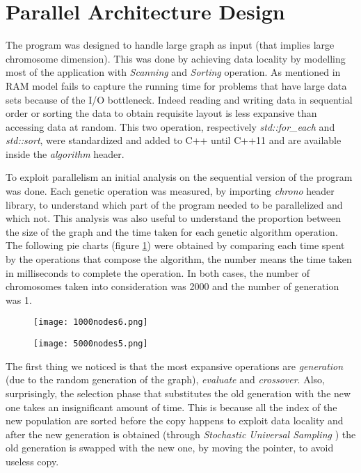 \section{Parallel Architecture Design}
The program was designed to handle large graph as input (that implies large chromosome dimension). This was done by achieving data locality by modelling most of the application with \textit{Scanning} and \textit{Sorting} operation. As mentioned in \cite{algo-eng} RAM model fails to capture the running time for problems that have large data sets because of the I/O bottleneck. Indeed reading and writing data in sequential order or sorting the data to obtain requisite layout is less expansive than accessing data at random. This two operation, respectively \textit{std::for\_each} and \textit{std::sort}, were standardized and added to C++ until C++11 and are available inside the \textit{algorithm} header.

To exploit parallelism an initial analysis on the sequential version of the program was done. Each genetic operation was measured, by importing \textit{chrono} header library, to understand which part of the program needed to be parallelized and which not. This analysis was also useful to understand the proportion between the size of the graph and the time taken for each genetic algorithm operation. The following pie charts (figure \ref{fig:pie-chart-times}) were obtained by comparing each time spent by the operations that compose the algorithm, the number means the time taken in milliseconds to complete the operation. In both cases, the number of chromosomes taken into consideration was 2000 and the number of generation was 1.
\vspace{1.7em}

\begin{figure}[H]
	\centering
	\begin{minipage}[t]{0.55\linewidth}
		\texttt{[image: 1000nodes6.png]}
		\vspace{0.2em}
	\end{minipage}%
	\begin{minipage}[t]{0.57\linewidth}
		\texttt{[image: 5000nodes5.png]}
		\vspace{0.1em}
	\end{minipage}
    \caption{}\label{fig:pie-chart-times}
\end{figure}

The first thing we noticed is that the most expansive operations are \textit{generation} (due to the random generation of the graph), \textit{evaluate} and \textit{crossover}.  Also, surprisingly, the selection phase that substitutes the old generation with the new one takes an insignificant amount of time. This is because all the index of the new population are sorted before the copy happens to exploit data locality and after the new generation is obtained (through \textit{Stochastic Universal Sampling} \cite{genetic-algorithm-tutorial}) the old generation is swapped with the new one, by moving the pointer, to avoid useless copy. 
\label{sez:architecture}


